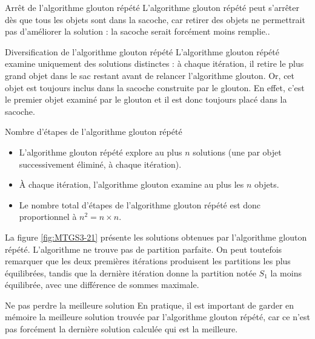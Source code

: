\documentclass[a4paper,twoside]{article}
\begin{document}
  \begin{remarque}{Arrêt de l'algorithme glouton répété}
    L'algorithme glouton répété peut s'arrêter dès que tous les objets sont dans la sacoche, car retirer des objets ne permettrait pas d'améliorer la solution : la sacoche serait forcément moins remplie..
  \end{remarque}


  \begin{remarque}{Diversification de l'algorithme glouton répété}
      L'algorithme glouton répété examine uniquement des solutions distinctes : à chaque itération, il retire le plus grand objet dans le sac restant avant de relancer l'algorithme glouton.
      Or, cet objet est toujours inclus dans la sacoche construite par le glouton.
      En effet, c'est le premier objet examiné par le glouton et il est donc toujours placé dans la sacoche.
  \end{remarque}

  \begin{remarque}{Nombre d'étapes de l'algorithme glouton répété}
    \begin{itemize}
    \item L'algorithme glouton répété explore au plus $n$ solutions (une par objet successivement éliminé, à chaque itération).
    \item À chaque itération, l'algorithme glouton examine au plus les $n$ objets.
    \item Le nombre total d'étapes de l'algorithme glouton répété est donc proportionnel à $n^2 = n \times n$.
    \end{itemize}
  \end{remarque}


  


  La figure \ref{fig:MTGS3-21} présente les solutions obtenues par l'algorithme glouton répété.
  L'algorithme ne trouve pas de partition parfaite.
  On peut toutefois remarquer que les deux premières itérations produisent les partitions les plus équilibrées, tandis que la dernière itération donne la partition notée $S_1$ la moins équilibrée, avec une différence de sommes maximale.

  \begin{remarque}{Ne pas perdre la meilleure solution}
    En pratique, il est important de garder en mémoire la meilleure solution trouvée par l'algorithme glouton répété, car ce n'est pas forcément la dernière solution calculée qui est la meilleure.
  \end{remarque}
\end{document}
